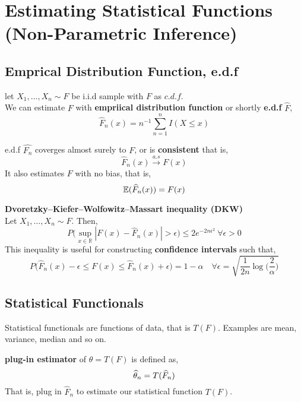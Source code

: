 \chapter{Estimating Statistical Functions (Non-Parametric Inference)}
\section{Emprical Distribution Function, e.d.f}
\begin{definition}
    let $X_1, \ldots, X_n \sim F$ be i.i.d sample with $F$ as $c.d.f$. \\
    We can estimate $F$ with \textbf{empriical distribution function} or shortly \textbf{e.d.f} $\widehat{F}$,
    \[\widehat{F}_n(x) = n^{-1} \sum_{n=1}^n I(X \le x) \]
\end{definition}

\begin{theorem}
    e.d.f $\widehat{F_n}$ coverges almost surely to $F$, or is \textbf{consistent} that is,
    \[ \widehat{F}_n(x) \stackrel{a.s}{\longrightarrow} F(x) \]
    It also estimates $F$ with no bias, that is,
    \[ {\mathbb{E}}(\widehat{F}_n(x)) = F(x)\]
\end{theorem}

\begin{theorem}
    \textbf{Dvoretzky–Kiefer–Wolfowitz–Massart inequality (DKW)}\\
    Let $X_1, \ldots, X_n \sim F$. Then,
    \[ P\biggl( \sup_{x \in \mathbb{R}} |F(x) - \widehat{F}_n(x)| > \epsilon \biggr) \le 2e^{-2n\epsilon^2} \ \forall \epsilon > 0\]
    This inequality is useful for constructing \textbf{confidence intervals} such that,
    \[ P \biggl( \widehat{F}_n(x) - \epsilon \le F(x) \le \widehat{F}_n(x) + \epsilon \biggr ) = 1 - \alpha \quad \forall \epsilon = \sqrt{\frac{1}{2n}\log\biggl(\frac{2}{\alpha} \biggr)}\]
\end{theorem}

\section{Statistical Functionals}
Statistical functionals are functions of data, that is $T(F)$. Examples are mean, variance, median and so on.
\begin{definition}
    \textbf{plug-in estimator} of $\theta = T(F)$ is defined as,
    \[  {\widehat{\theta}}_n = T(\widehat{F}_n)\]
    That is, plug in $\widehat{F}_n$ to estimate our statistical function $T(F)$.
\end{definition}

